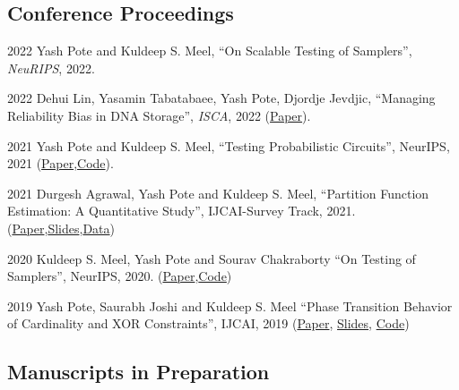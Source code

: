\documentclass[12pt,letterpaper]{report}
\begin{document}
    \subsection*{Conference Proceedings}

    \begin{tablist}       
    	
    	\item[2022] \tab  Yash Pote  and Kuldeep S. Meel, \enquote{On Scalable Testing of Samplers},  \textit{NeuRIPS},  2022.
    		
    	\item[2022] \tab  Dehui Lin, Yasamin Tabatabaee, Yash Pote, Djordje Jevdjic, \enquote{Managing Reliability Bias in DNA Storage}, \textit{ISCA},  2022 (\href{https://dl.acm.org/doi/pdf/10.1145/3470496.3527441}{Paper}).
    				
    	\item[2021] \tab  Yash Pote  and Kuldeep S. Meel, \enquote{Testing Probabilistic Circuits},  {NeurIPS},  2021 (\href{https://www.comp.nus.edu.sg/~meel/Papers/neurips21-pm.pdf}{Paper},\href{https://github.com/meelgroup/teq}{Code}).
    	
    	\item[2021] \tab  Durgesh Agrawal, Yash Pote  and Kuldeep S. Meel, \enquote{Partition Function Estimation: A Quantitative Study}, IJCAI-Survey Track,  2021.(\href{https://arxiv.org/abs/2105.11132}{Paper},\href{https://meelgroup.github.io/publication/ijcai21_partition}{Slides},\href{https://doi.org/10.5281/zenodo.4769117}{Data})
    	
    	\item[2020] \tab Kuldeep S. Meel, Yash Pote  and Sourav Chakraborty \enquote{On Testing of Samplers}, NeurIPS, 2020. (\href{https://arxiv.org/abs/2010.12918}{Paper},\href{https://github.com/meelgroup/barbarik}{Code})
    	
    	
        \item[2019] \tab Yash Pote, Saurabh Joshi and Kuldeep S. Meel  \enquote{Phase Transition Behavior of Cardinality and
        XOR Constraints}, IJCAI, 2019 (\href{https://www.ijcai.org/proceedings/2019/0162.pdf}{Paper}, \href{https://meelgroup.github.io/files/slides/ijcai19pjm.pdf}{Slides}, \href{https://github.com/meelgroup/1-CARD-XOR/}{Code})
        

	
    \end{tablist}

    \subsection*{Manuscripts in Preparation}
\end{document}
